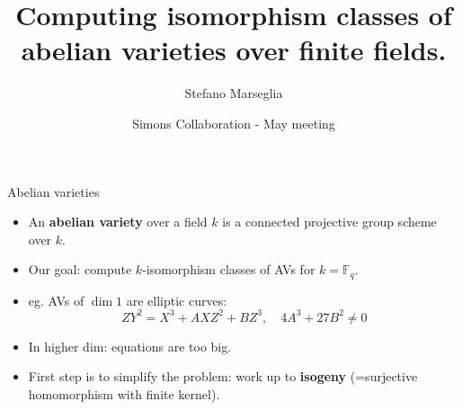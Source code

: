 \documentclass[usenames,dvipsnames,handout]{beamer}
\title[]{ Computing isomorphism classes of\\abelian varieties over finite fields. }
\subtitle{}
\author[Stefano Marseglia]{Stefano Marseglia}
\institute[]{Utrecht University}
\date[ May 6, 2023 ]{\large Simons Collaboration - May meeting}
\def\Z{\mathbb{Z}}
\def\C{\mathbb{C}}
\def\F{\mathbb{F}}
\newcommand{\set}[1]{\left\lbrace#1\right\rbrace }
\newcommand{\red}[1]{\textcolor{red}{#1}}
\newcommand{\blue}[1]{\textcolor{blue}{#1}}
\begin{document}

\begin{frame}
\titlepage
\end{frame}


\begin{frame}{ Abelian varieties }    
    \begin{itemize}
     \item An {\bf abelian variety} over a field $k$ is a connected projective group scheme over $k$.
\pause     
     \item Our goal: compute $k$-isomorphism classes of AVs for $k=\F_q$.
\pause
    \item eg. AVs of $\dim 1$ are elliptic curves:
    \[ ZY^2 = X^3 + AXZ^2 + BZ^3 ,\quad  4A^3+27B^2 \neq 0 \]
\pause 
\vspace{-2em}
    \item In higher dim: equations are too big.
\pause 
    \item First step is to simplify the problem: work up to {\bf isogeny} (=surjective homomorphism with finite kernel).
	\end{itemize}
\end{frame}
\end{document}
